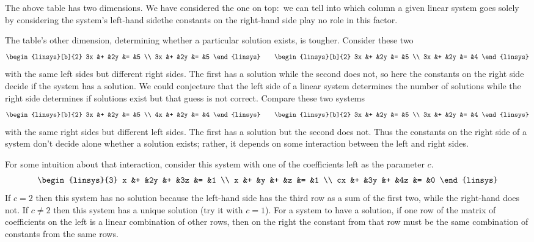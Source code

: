 The above table has two dimensions.
We have considered the one on top:~we can tell
into which column a given linear system goes
solely by considering the system's left-hand side\Dash the 
constants on the right-hand side play no role in this factor.

The table's other dimension, 
determining whether a particular solution exists, is tougher.
Consider these two
\begin{equation*}
  \begin{linsys}[b]{2}
    3x &+ &2y &= &5  \\
    3x &+ &2y &= &5
  \end{linsys}
  \qquad
  \begin{linsys}[b]{2}
    3x &+ &2y &= &5  \\
    3x &+ &2y &= &4
  \end{linsys}
\end{equation*}
with the same left sides but different right sides.
The first has a solution while the second does not, so
here the constants on the right side decide if the system has a solution.
We could conjecture that the left side of a linear system determines
the number of solutions while the right side determines if solutions
exist but that guess is not correct.
Compare these two systems
\begin{equation*}
  \begin{linsys}[b]{2}
    3x &+ &2y &= &5  \\
    4x &+ &2y &= &4
  \end{linsys}
  \qquad
  \begin{linsys}[b]{2}
    3x &+ &2y &= &5  \\
    3x &+ &2y &= &4
  \end{linsys}
\end{equation*}
with the same right sides but different left sides.
The first has a solution but the second does not.
Thus the constants on the right side of a system 
don't decide alone whether a solution exists;
rather, it depends on some interaction between the left and
right sides.

For some intuition about that interaction,
consider this system with one of the coefficients left as the 
parameter $c$.
\begin{equation*}
  \begin{linsys}{3}
    x  &+  &2y  &+  &3z  &=  &1  \\
    x  &+  &y   &+  &z   &=  &1  \\
   cx  &+  &3y  &+  &4z  &=  &0
  \end{linsys}
\end{equation*}
If \( c=2 \) then this system has no solution because the left-hand side 
has the third row as a sum of the first two, while the right-hand does not.
If \( c\neq 2 \) then this system has a unique solution (try it with \( c=1 \)).
For a system to have a solution, if one row of the matrix of coefficients on
the left is a linear combination of other rows,
then on the right the constant from that row must be the same
combination of constants from the same rows.


